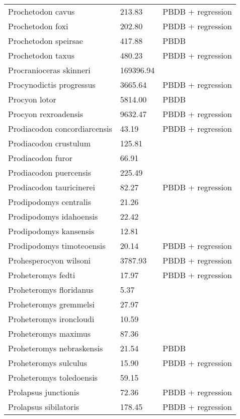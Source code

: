 \begin{center}
\begin{longtable}{p{} p{} p{} }
  Prochetodon cavus & 213.83 & PBDB + regression \\ 
  Prochetodon foxi & 202.80 & PBDB + regression \\ 
  Prochetodon speirsae & 417.88 & PBDB \\ 
  Prochetodon taxus & 480.23 & PBDB + regression \\ 
  Procranioceras skinneri & 169396.94 & \cite{Tomiya2013} \\ 
  Procynodictis progressus & 3665.64 & PBDB + regression \\ 
  Procyon lotor & 5814.00 & PBDB \\ 
  Procyon rexroadensis & 9632.47 & PBDB + regression \\ 
  Prodiacodon concordiarcensis & 43.19 & PBDB + regression \\ 
  Prodiacodon crustulum & 125.81 & \cite{Lim2001} \\ 
  Prodiacodon furor & 66.91 & \cite{Scott1937} \\ 
  Prodiacodon puercensis & 225.49 & \cite{Mellett1969} \\ 
  Prodiacodon tauricinerei & 82.27 & PBDB + regression \\ 
  Prodipodomys centralis & 21.26 & \cite{Becker1981} \\ 
  Prodipodomys idahoensis & 22.42 & \cite{Tomiya2013} \\ 
  Prodipodomys kansensis & 12.81 & \cite{Tomiya2013} \\ 
  Prodipodomys timoteoensis & 20.14 & PBDB + regression \\ 
  Prohesperocyon wilsoni & 3787.93 & PBDB + regression \\ 
  Proheteromys fedti & 17.97 & PBDB + regression \\ 
  Proheteromys floridanus & 5.37 & \cite{Tomiya2013} \\ 
  Proheteromys gremmelsi & 27.97 & \cite{Becker1981} \\ 
  Proheteromys ironcloudi & 10.59 & \cite{Tomiya2013} \\ 
  Proheteromys maximus & 87.36 & \cite{Tomiya2013} \\ 
  Proheteromys nebraskensis & 21.54 & PBDB \\ 
  Proheteromys sulculus & 15.90 & PBDB + regression \\ 
  Proheteromys toledoensis & 59.15 & \cite{Tomiya2013} \\ 
  Prolapsus junctionis & 72.36 & PBDB + regression \\ 
  Prolapsus sibilatoris & 178.45 & PBDB + regression \\ 

\end{longtable}
\end{center}
